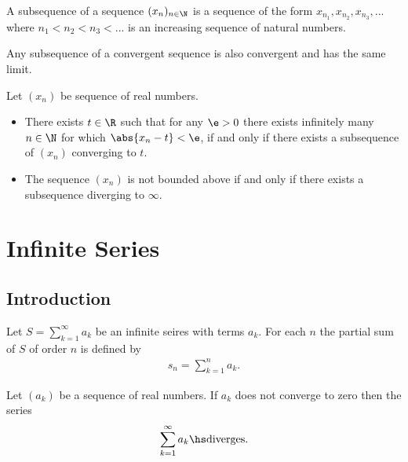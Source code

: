 \documentclass{article}
\begin{document}
\begin{definition}
    A subsequence of a sequence $(x_n)_{n\in\N}$ is a sequence of the form $x_{n_1}, x_{n_2}, x_{n_3}, ...$
    where $n_1<n_2<n_3<...$ is an increasing sequence of natural numbers.
\end{definition}

\begin{lemma}
    Any subsequence of a convergent sequence is also convergent and has the same limit.
\end{lemma}

\begin{theorem}
    Let $(x_n)$ be sequence of real numbers.
    \begin{itemize}
        \item There exists $t\in\R$ such that for any $\e>0$ there exists infinitely many $n\in\N$
              for which $\abs{x_n-t}<\e$, if and only if there exists a subsequence of $(x_n)$
              converging to $t$.
        \item The sequence $(x_n)$ is not bounded above if and only if there exists a subsequence
              diverging to $\infty$.
    \end{itemize}
\end{theorem}


\section{Infinite Series}


\subsection{Introduction}

\begin{definition}
    Let $S=\sum_{k=1}^\infty a_k$ be an infinite seires with terms $a_k$.
    For each $n$ the partial sum of $S$ of order $n$ is defined by
    \begin{align*}
        s_n = \sum_{k=1}^n a_k.
    \end{align*}
\end{definition}

\setcounter{theorem}{6}
\begin{theorem}
    Let $(a_k)$ be a sequence of real numbers. If $a_k$ does not
    converge to zero then the series
    \begin{align*}
        \sum_{k=1}^\infty a_k\hs\text{diverges}.
    \end{align*}
\end{theorem}
\end{document}
